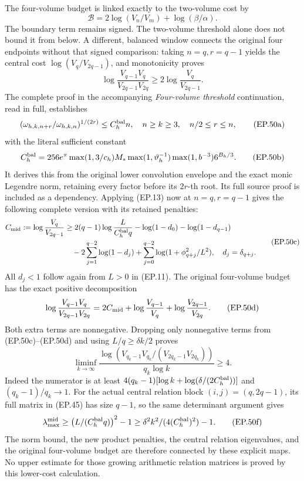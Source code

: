 \documentclass[11pt]{article}
\begin{document}
The four-volume budget is linked exactly to the two-volume cost by
\[
 \mathcal B=2\log(V_n/V_m)+\log(\beta/\alpha).\tag{EP.49}
\]
The boundary term remains signed. The two-volume threshold alone
does not bound it from below. A different, balanced window connects
the original four endpoints without that signed comparison: taking
$n=q,r=q-1$ yields the central cost $\log(V_q/V_{2q-1})$, and
monotonicity proves
\[
 \log\frac{V_{q-1}V_q}{V_{2q-1}V_{2q}}
 \ge2\log\frac{V_q}{V_{2q-1}}.\tag{EP.50}
\]
The complete proof in the accompanying \emph{Four-volume threshold}
continuation, read in full, establishes
\[
 (\omega_{h,k,n+r}/\omega_{h,k,n})^{1/(2r)}\le C_h^{\rm bal}n,
 \quad n\ge k\ge3,\quad n/2\le r\le n,
\tag{EP.50a}
\]
with the literal sufficient constant
\[
 C_h^{\rm bal}=256e^\pi\max(1,3/c_h)M_*
 \max(1,\vartheta_h^{-1})\max(1,b^{-3})6^{B_h/3}.
\tag{EP.50b}
\]
It derives this from the original lower convolution envelope and
the exact monic Legendre norm, retaining every factor before its
$2r$-th root. Its full source proof is included as a dependency.
Applying (EP.13) now at $n=q,r=q-1$ gives the following complete
version with its retained penalties:
\[
 \begin{split}
 C_{\rm mid}:=\log\frac{V_q}{V_{2q-1}}
 &\ge2(q-1)\log\frac{L}{C_h^{\rm bal}q}
 -\log(1-d_0)-\log(1-d_{q-1})\\
 &\quad-2\sum_{j=1}^{q-2}\log(1-d_j)
 +\sum_{j=0}^{q-2}\log(1+\phi_{q+j}^2/L^2),
 \quad d_j=\delta_{q+j}.
 \end{split}\tag{EP.50c}
\]
All $d_j<1$ follow again from $L>0$ in (EP.11). The original
four-volume budget has the exact positive decomposition
\[
 \log\frac{V_{q-1}V_q}{V_{2q-1}V_{2q}}
 =2C_{\rm mid}+\log\frac{V_{q-1}}{V_q}
                 +\log\frac{V_{2q-1}}{V_{2q}}.
\tag{EP.50d}
\]
Both extra terms are nonnegative. Dropping only nonnegative terms
from (EP.50c)--(EP.50d) and using $L/q\ge\delta k/2$ proves
\[
 \boxed{\liminf_{k\to\infty}
 \frac{\log(V_{q_k-1}V_{q_k}/(V_{2q_k-1}V_{2q_k}))}
 {q_k\log k}\ge4.}\tag{EP.50e}
\]
Indeed the numerator is at least
$4(q_k-1)[\log k+\log(\delta/(2C_h^{\rm bal}))]$ and
$(q_k-1)/q_k\to1$. For the actual central relation block
$(i,j)=(q,2q-1)$, its full matrix in (EP.45) has size $q-1$,
so the same determinant argument gives
\[
 \lambda_{\max}^{\rm mid}\ge
 \left(L/(C_h^{\rm bal}q)\right)^2-1
 \ge\delta^2k^2/(4(C_h^{\rm bal})^2)-1.\tag{EP.50f}
\]
The norm bound, the new product penalties, the central relation
eigenvalues, and the original four-volume budget are therefore
connected by these explicit maps. No upper estimate for those
growing arithmetic relation matrices is proved by this lower-cost
calculation.
\end{document}
